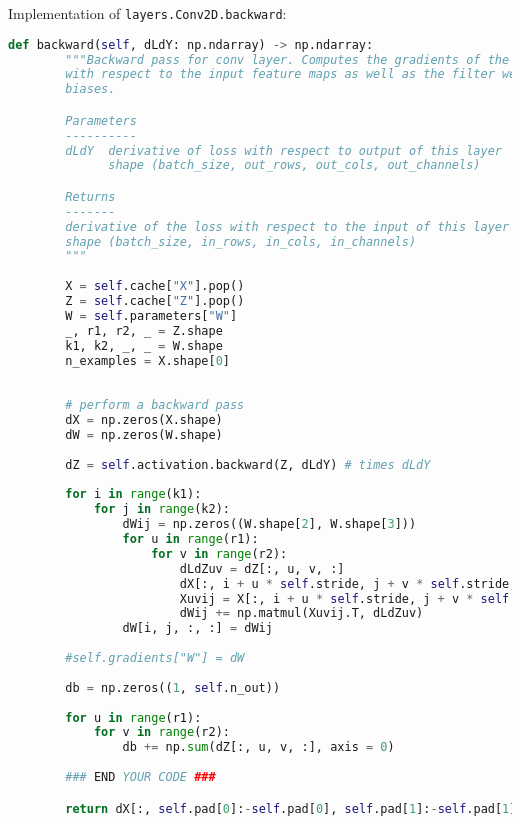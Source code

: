 Implementation of \texttt{layers.Conv2D.backward}:

\begin{lstlisting}[language=Python]
    def backward(self, dLdY: np.ndarray) -> np.ndarray:
        """Backward pass for conv layer. Computes the gradients of the output
        with respect to the input feature maps as well as the filter weights and
        biases.

        Parameters
        ----------
        dLdY  derivative of loss with respect to output of this layer
              shape (batch_size, out_rows, out_cols, out_channels)

        Returns
        -------
        derivative of the loss with respect to the input of this layer
        shape (batch_size, in_rows, in_cols, in_channels)
        """
        
        X = self.cache["X"].pop()
        Z = self.cache["Z"].pop()
        W = self.parameters["W"]
        _, r1, r2, _ = Z.shape
        k1, k2, _, _ = W.shape
        n_examples = X.shape[0]
        
        
        # perform a backward pass
        dX = np.zeros(X.shape)
        dW = np.zeros(W.shape)
        
        dZ = self.activation.backward(Z, dLdY) # times dLdY
        
        for i in range(k1):
            for j in range(k2):
                dWij = np.zeros((W.shape[2], W.shape[3]))
                for u in range(r1):
                    for v in range(r2):
                        dLdZuv = dZ[:, u, v, :]
                        dX[:, i + u * self.stride, j + v * self.stride, :] += np.matmul(dLdZuv, W[i, j, :, :].T)
                        Xuvij = X[:, i + u * self.stride, j + v * self.stride, :]
                        dWij += np.matmul(Xuvij.T, dLdZuv)
                dW[i, j, :, :] = dWij
                
        #self.gradients["W"] = dW
        
        db = np.zeros((1, self.n_out))
        
        for u in range(r1):
            for v in range(r2):
                db += np.sum(dZ[:, u, v, :], axis = 0)
            
        ### END YOUR CODE ###

        return dX[:, self.pad[0]:-self.pad[0], self.pad[1]:-self.pad[1], :]

\end{lstlisting}


